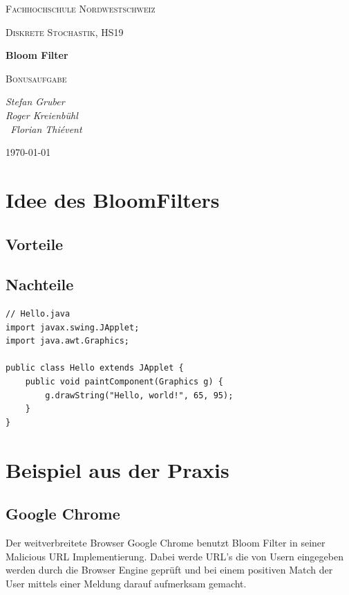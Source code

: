 \documentclass[12pt,a4paper]{report}
\begin{document}
\begin{titlepage}
	\centering
	\qquad
	\par\vspace{1cm}
	{\scshape\LARGE Fachhochschule Nordwestschweiz \par}
	{\scshape\Large Diskrete Stochastik, HS19\par}
	\vspace{5cm}
	{\huge\bfseries Bloom Filter\par}
	{\scshape\Large Bonusaufgabe\par}
	\vspace{2cm}
	{\Large\itshape  Stefan Gruber \\ Roger Kreienbühl \\ Florian Thiévent \par}
	\vfill
	{\large \today\par}
\end{titlepage}

\tableofcontents
\newpage

\chapter{Idee des BloomFilters}\label{ch:idee-des-bloomfilters}
\section{Vorteile}\label{sec:vorteile}
\section{Nachteile}\label{sec:nachteile}
\begin{lstlisting}
// Hello.java
import javax.swing.JApplet;
import java.awt.Graphics;

public class Hello extends JApplet {
    public void paintComponent(Graphics g) {
        g.drawString("Hello, world!", 65, 95);
    }    
}
\end{lstlisting}

\chapter{Beispiel aus der Praxis}\label{ch:beispiel-aus-der-praxis}
\section{Google Chrome}\label{sec:google-chrome}
Der weitverbreitete Browser Google Chrome benutzt Bloom Filter in seiner Malicious URL Implementierung. Dabei werde URL's die von Usern eingegeben werden durch die Browser Engine geprüft und bei einem positiven Match der User mittels einer Meldung darauf aufmerksam gemacht.
\end{document}
